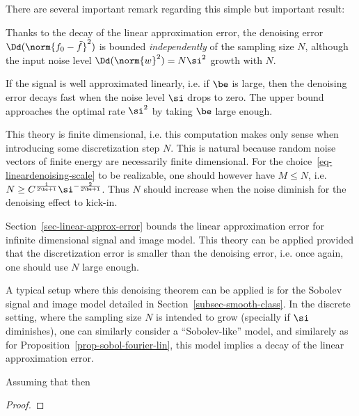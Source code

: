 There are several important remark regarding this simple but important result:
\begin{rs}
	\item Thanks to the decay of the linear approximation error, the denoising error $\Dd(\norm{f_0 - \tilde f}^2)$ is bounded \textit{independently} of the sampling size $N$, although the input noise level $\Dd(\norm{w}^2)=N\si^2$ growth with $N$.
	\item If the signal is well approximated linearly, i.e. if $\be$ is large, then the denoising error decays fast when the noise level $\si$ drops to zero. The upper bound approaches the optimal rate $\si^2$ by taking $\be$ large enough. 
	\item This theory is finite dimensional, i.e. this computation makes only sense when introducing some discretization step $N$. This is natural because random noise vectors of finite energy are necessarily finite dimensional. For the choice~\eqref{eq-lineardenoising-scale} to be realizable, one should however have $M \leq N$, i.e. $N \geq C^{\frac{1}{2\be+1}} \si^{-\frac{2}{2\be+1}}$. Thus $N$ should increase when the noise diminish for the denoising effect to kick-in. 
	\item Section~\ref{sec-linear-approx-error} bounds the linear approximation error for infinite dimensional signal and image model. This theory can be applied provided that the discretization error is smaller than the denoising error, i.e. once again, one should use $N$ large enough. 
\end{rs}

A typical setup where this denoising theorem can be applied is for the Sobolev signal and image model detailed in Section~\ref{subsec-smooth-class}.  In the discrete setting, where the sampling size $N$ is intended to grow (specially if $\si$ diminishes), one can similarly consider a ``Sobolev-like'' model, and similarely as for Proposition~\ref{prop-sobol-fourier-lin}, this model implies a decay of the linear approximation error.

\begin{prop}
	Assuming that 
	then 
\end{prop}
\begin{proof}
\end{proof}

